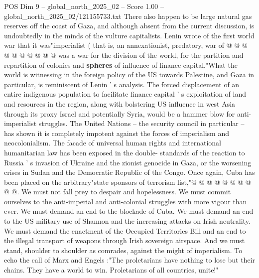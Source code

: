 \begin{textsample}{POS Dim 9 – global\_north\_2025\_02 – Score 1.00 – global\_north\_2025\_02/121155733.txt}
There also happen to be large natural gas reserves off the coast of Gaza, and although absent from the current discussion, is undoubtedly in the minds of the vulture capitalists.
Lenin wrote of the first world war that it was"imperialist ( that is, an annexationist, predatory, war of @ @ @ @ @ @ @ @ @ @ was a war for the division of the world, for the partition and repartition of colonies and \textbf{spheres} of influence of finance capital."What the world is witnessing in the foreign policy of the US towards Palestine, and Gaza in particular, is reminiscent of Lenin ' s analysis.
The forced displacement of an entire indigenous population to facilitate finance capital ' s exploitation of land and resources in the region, along with bolstering US influence in west Asia through its proxy Israel and potentially Syria, would be a hammer blow for anti-imperialist struggles.
The United Nations -- the security council in particular -- has shown it is completely impotent against the forces of imperialism and neocolonialism.
The facade of universal human rights and international humanitarian law has been exposed in the double- standards of the reaction to Russia ' s invasion of Ukraine and the zionist genocide in Gaza, or the worsening crises in Sudan and the Democratic Republic of the Congo.
Once again, Cuba has been placed on the arbitrary"state sponsors of terrorism list,"@ @ @ @ @ @ @ @ @ @.
We must not fall prey to despair and hopelessness.
We must commit ourselves to the anti-imperial and anti-colonial struggles with more vigour than ever.
We must demand an end to the blockade of Cuba.
We must demand an end to the US military use of Shannon and the increasing attacks on Irish neutrality.
We must demand the enactment of the Occupied Territories Bill and an end to the illegal transport of weapons through Irish sovereign airspace.
And we must stand, shoulder to shoulder as comrades, against the might of imperialism.
To echo the call of Marx and Engels :"The proletarians have nothing to lose but their chains.
They have a world to win.
Proletarians of all countries, unite!"

\end{textsample}
